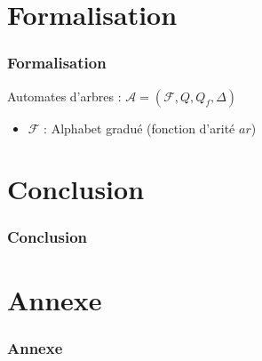 \documentclass{beamer}
\begin{document}
\section{Formalisation}
\begin{frame}
		\frametitle{Formalisation}
		Automates d'arbres : $\mathcal A  = (\mathcal F, Q, Q_f, \Delta)$\\
		\begin{itemize}
				\item{$\mathcal F$ : Alphabet gradué (fonction d'arité $ar$) }
		\end{itemize}
\end{frame}

\section{Conclusion}
\begin{frame}
		\frametitle{Conclusion}
\end{frame}

\section{Annexe}
\begin{frame}[fragile]
		\frametitle{Annexe}
\end{frame}
\end{document}
